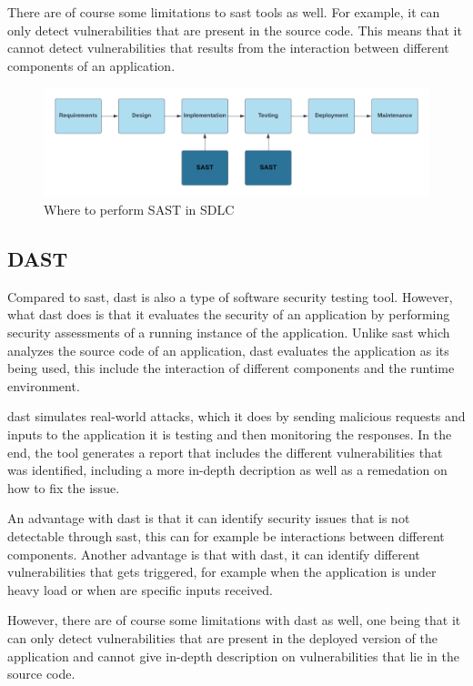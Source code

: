 There are of course some limitations to \acrshort{sast} tools as well. For example, it can only detect vulnerabilities that are present in the source code. This means that it cannot detect vulnerabilities that results from the interaction between different components of an application.
\begin{figure}[htp]
    \centering
    \includegraphics[width=1\columnwidth]{Images/SAST.png}
    \caption{Where to perform SAST in SDLC}
    \label{fig:my_label}
\end{figure}

\newpage
\subsection{DAST}
Compared to \acrlong{sast}, \acrlong{dast} is also a type of software security testing tool. However, what \acrshort{dast} does is that it evaluates the security of an application by performing security assessments of a running instance of the application. Unlike \acrshort{sast} which analyzes the source code of an application, \acrshort{dast} evaluates the application as its being used, this include the interaction of different components and the runtime environment. 

\acrshort{dast} simulates real-world attacks, which it does by sending malicious requests and inputs to the application it is testing and then monitoring the responses. In the end, the tool generates a report that includes the different vulnerabilities that was identified, including a more in-depth decription as well as a remedation on how to fix the issue. \cite{dast}

An advantage with \acrshort{dast} is that it can identify security issues that is not detectable through \acrshort{sast}, this can for example be interactions between different components. Another advantage is that with \acrshort{dast}, it can identify different vulnerabilities that gets triggered, for example when the application is under heavy load or when are specific inputs received.

However, there are of course some limitations with \acrshort{dast} as well, one being that it can only detect vulnerabilities that are present in the deployed version of the application and cannot give in-depth description on vulnerabilities that lie in the source code.

